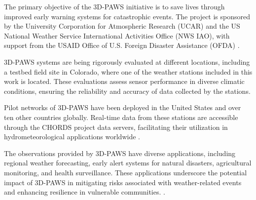 The primary objective of the 3D-PAWS initiative is to save lives through improved early warning systems for catastrophic events.
The project is sponsored by the University Corporation for Atmospheric Research (UCAR) and the US National Weather Service International Activities Office (NWS IAO), with support from the USAID Office of U.S. Foreign Disaster Assistance (OFDA) \cite{3dpaws_manual}.

3D-PAWS systems are being rigorously evaluated at different locations, including a testbed field site in Colorado, where one of the weather stations included in this work is located.
These evaluations assess sensor performance in diverse climatic conditions, ensuring the reliability and accuracy of data collected by the stations. \cite{muita2021}

Pilot networks of 3D-PAWS have been deployed in the United States and over ten other countries globally. Real-time data from these stations are accessible through the CHORDS project data servers, facilitating their utilization in hydrometeorological applications worldwide \cite{3dpaws_manual}.

The observations provided by 3D-PAWS have diverse applications, including regional weather forecasting, early alert systems for natural disasters, agricultural monitoring, and health surveillance.
These applications underscore the potential impact of 3D-PAWS in mitigating risks associated with weather-related events and enhancing resilience in vulnerable communities. \cite{3dpaws_manual}.